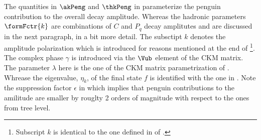 \noindent The quantities in $\akPeng$ and $\thkPeng$ in  parameterize the penguin contribution to the overall \BsJpsiPhi
decay amplitude. Whereas the hadronic parameters $\formFctr{k}$ are combinations of $C$ and $P_q$ decay amplitutes and are discussed in the next paragraph,
in a bit more detail.
The subsctipt $k$ denotes the \BsJpsiPhi amplitude polarization which is introduced for reasons mentioned at the end of
\footnote{Subscript $k$ is identical to the one defined in  of .}.
The complex phase $\gamma$ is introduced via the $\Vub$ element of the CKM matrix. The parameter $\lambda$ here is the one of the
CKM matrix parametrization of . Whrease the eigenvalue, $\eta_k$, of the final state $f$ is identified with the one in .
Note the suppression factor $\epsilon$ in  which implies that penguin contributions to the \BsJpsiPhi amilitude are smaller
by rouglty 2 orders of magnitude with respect to the ones from tree level.
